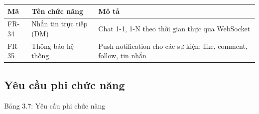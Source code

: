 {\def\LTcaptype{none} %
\begin{longtable}{
  |>{\centering\arraybackslash}p{}
  |>{\centering\arraybackslash}p{}
  |>{\centering\arraybackslash}p{}|}
\endhead
\hline
\endlastfoot
Mã & Tên chức năng & Mô tả \\ \hline
FR-34 & Nhắn tin trực tiếp (DM) & Chat 1-1, 1-N theo thời gian thực qua
WebSocket \\ \hline
FR-35 & Thông báo hệ thống & Push notification cho các sự kiện: like,
comment, follow, tin nhắn \\ \hline
\end{longtable}
}

\subsection{Yêu cầu phi chức
năng}\label{yuxeau-cux1ea7u-phi-chux1ee9c-nux103ng}

Bảng 3.7: Yêu cầu phi chức năng

